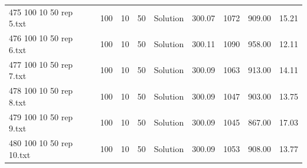 \begin{longtable}{lrrllrrrr}
475 100 10 50 rep 5.txt & 100 & 10 & 50 & Solution & 300.07 & 1072 & 909.00 & 15.21\\
476 100 10 50 rep 6.txt & 100 & 10 & 50 & Solution & 300.11 & 1090 & 958.00 & 12.11\\
477 100 10 50 rep 7.txt & 100 & 10 & 50 & Solution & 300.09 & 1063 & 913.00 & 14.11\\
478 100 10 50 rep 8.txt & 100 & 10 & 50 & Solution & 300.09 & 1047 & 903.00 & 13.75\\
479 100 10 50 rep 9.txt & 100 & 10 & 50 & Solution & 300.09 & 1045 & 867.00 & 17.03\\
480 100 10 50 rep 10.txt & 100 & 10 & 50 & Solution & 300.09 & 1053 & 908.00 & 13.77\\
\end{longtable}

